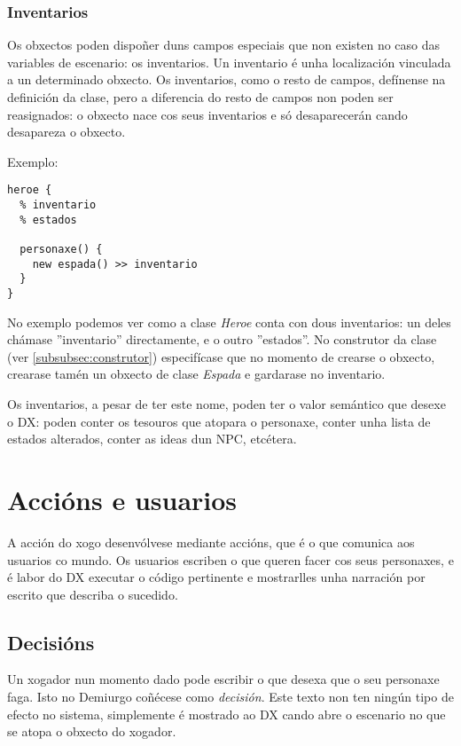\subsubsection{Inventarios}
\label{subsec:inventarios}
Os obxectos poden dispoñer duns campos especiais que non existen no caso das
variables de escenario: os inventarios. Un inventario é unha localización
vinculada a un determinado obxecto. Os inventarios, como o resto de campos,
defínense na definición da clase, pero a diferencia do resto de campos non
poden ser reasignados: o obxecto nace cos seus
inventarios e só desaparecerán cando desapareza o obxecto.
\par Exemplo:
\begin{lstlisting}
heroe {
  % inventario
  % estados
  
  personaxe() {
    new espada() >> inventario
  }
}
\end{lstlisting}
\par
No exemplo podemos ver como a clase {\it Heroe} conta con dous
inventarios: un deles chámase ''inventario'' directamente, e o outro
''estados''. No construtor da clase (ver \ref{subsubsec:construtor})
especifícase que no momento de crearse o obxecto, crearase tamén un obxecto de
clase {\it Espada} e gardarase no inventario.
\par
Os inventarios, a pesar de ter este nome, poden ter o valor semántico que desexe
o DX: poden conter os tesouros que atopara o personaxe, conter unha lista de
estados alterados, conter as ideas dun NPC, etcétera. 





\section{Accións e usuarios}
A acción do xogo desenvólvese mediante accións, que é o que comunica aos
usuarios co mundo. Os usuarios escriben o que queren facer cos seus personaxes,
e é labor do DX executar o código pertinente e mostrarlles unha narración
por escrito que describa o sucedido.
\subsection{Decisións}
Un xogador nun momento dado pode escribir o que desexa que o seu personaxe faga.
Isto no Demiurgo coñécese como {\it decisión}. Este texto non ten ningún tipo de
efecto no sistema, simplemente é mostrado ao DX cando abre o escenario no que se
atopa o obxecto do xogador.

